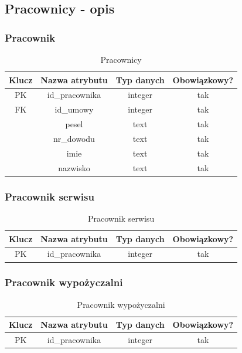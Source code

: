\documentclass{sprawozdanie-agh}
\begin{document}
\subsection{Pracownicy - opis}
\subsubsection{Pracownik}
\begin{table}[H]
	\centering
	\begin{tabular}{|c|c|c|c|}
		\hline
		Klucz & Nazwa atrybutu & Typ danych & Obowiązkowy? \\ \hline
		PK    & id\_pracownika & integer    & tak           \\ \hline
		FK    & id\_umowy      & integer    & tak           \\ \hline
		      & pesel          & text       & tak           \\ \hline
		      & nr\_dowodu     & text       & tak           \\ \hline
		      & imie           & text       & tak           \\ \hline
		      & nazwisko       & text       & tak           \\ \hline
	\end{tabular}
	\caption{Pracownicy}
\end{table}

\subsubsection{Pracownik serwisu}
\begin{table}[H]
	\centering
	\begin{tabular}{|c|c|c|c|}
		\hline
		Klucz & Nazwa atrybutu & Typ danych & Obowiązkowy? \\ \hline
		PK    & id\_pracownika & integer    & tak           \\ \hline
	\end{tabular}
	\caption{Pracownik serwisu}
\end{table}

\subsubsection{Pracownik wypożyczalni}
\begin{table}[H]
	\centering
	\begin{tabular}{|c|c|c|c|}
		\hline
		Klucz & Nazwa atrybutu & Typ danych & Obowiązkowy? \\ \hline
		PK    & id\_pracownika & integer    & tak           \\ \hline
	\end{tabular}
	\caption{Pracownik wypożyczalni}
\end{table}
\end{document}
